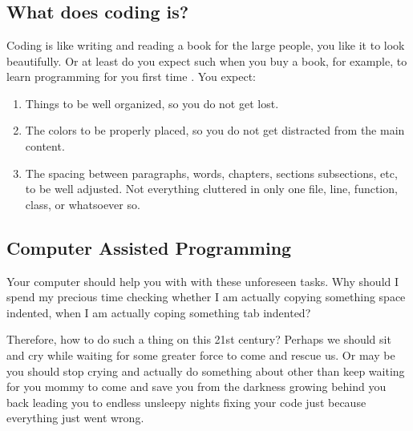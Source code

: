 

%


\chapter{}


\section{What does coding is?}

Coding is like writing and reading a book for the large people, you like it
to look beautifully. Or at least do you expect such when you buy a book, for
example, to learn programming for you first time \cite{howNovicesRead}.
You expect:

\begin{enumerate}
    \item Things to be well organized,
          so you do not get lost.
    \item The colors to be properly placed,
          so you do not get distracted from the main content.
    \item The spacing between paragraphs, words, chapters, sections
          subsections, etc, to be well adjusted.
          Not everything cluttered in only one file,
          line, function, class, or whatsoever so.
\end{enumerate}



\section{Computer Assisted Programming}

Your computer should help you with with these unforeseen tasks.
Why should I spend my precious time checking whether I am actually copying
something space indented,
when I am actually coping something tab indented?

Therefore, how to do such a thing on this 21\q{}st century?
Perhaps we should sit and cry while waiting for some greater force to come
and rescue us. Or may be you should stop crying and actually do something
about other than keep waiting for you mommy to come and save you from the
darkness growing behind you back leading you to endless unsleepy nights
fixing your code just because everything just went wrong.



